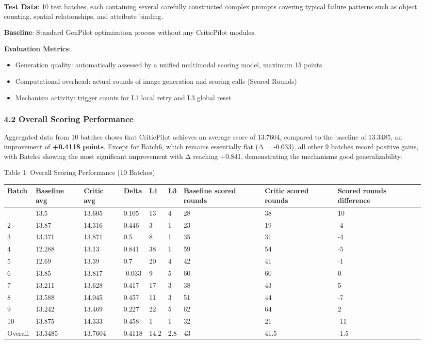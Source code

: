 \documentclass[
]{article}
\newcounter{none} %
\begin{document}
\textbf{Test Data}: 10 test batches, each containing several carefully
constructed complex prompts covering typical failure patterns such as
object counting, spatial relationships, and attribute binding.

\textbf{Baseline}: Standard GenPilot optimization process without any
CriticPilot modules.

\textbf{Evaluation Metrics}:

\begin{itemize}
\item
  Generation quality: automatically assessed by a unified multimodal
  scoring model, maximum 15 points
\item
  Computational overhead: actual rounds of image generation and scoring
  calls (Scored Rounds)
\item
  Mechanism activity: trigger counts for L1 local retry and L3 global
  reset
\end{itemize}

\subsubsection{4.2 Overall Scoring
Performance}\label{42-overall-scoring-performance}

Aggregated data from 10 batches shows that CriticPilot achieves an
average score of 13.7604, compared to the baseline of 13.3485, an
improvement of \textbf{+0.4118 points}. Except for Batch6, which remains
essentially flat (Δ = -0.033), all other 9 batches record positive
gains, with Batch4 showing the most significant improvement with Δ
reaching +0.841, demonstrating the mechanism\textquotesingle s good
generalizability.

Table 1: Overall Scoring Performance (10 Batches)

{\def\LTcaptype{none} %
\begin{longtable}[]{@{}lllllllll@{}}
\toprule\noalign{}
Batch & Baseline avg & Critic avg & Delta & L1 & L3 & Baseline scored
rounds & Critic scored rounds & Scored rounds difference \\
\midrule\noalign{}
\endhead
\bottomrule\noalign{}
\endlastfoot
1 & 13.5 & 13.605 & 0.105 & 13 & 4 & 28 & 38 & 10 \\
2 & 13.87 & 14.316 & 0.446 & 3 & 1 & 23 & 19 & -4 \\
3 & 13.371 & 13.871 & 0.5 & 8 & 1 & 35 & 31 & -4 \\
4 & 12.288 & 13.13 & 0.841 & 38 & 1 & 59 & 54 & -5 \\
5 & 12.69 & 13.39 & 0.7 & 20 & 4 & 42 & 41 & -1 \\
6 & 13.85 & 13.817 & -0.033 & 9 & 5 & 60 & 60 & 0 \\
7 & 13.211 & 13.628 & 0.417 & 17 & 3 & 38 & 43 & 5 \\
8 & 13.588 & 14.045 & 0.457 & 11 & 3 & 51 & 44 & -7 \\
9 & 13.242 & 13.469 & 0.227 & 22 & 5 & 62 & 64 & 2 \\
10 & 13.875 & 14.333 & 0.458 & 1 & 1 & 32 & 21 & -11 \\
Overall & 13.3485 & 13.7604 & 0.4118 & 14.2 & 2.8 & 43 & 41.5 & -1.5 \\
\end{longtable}
}
\end{document}
